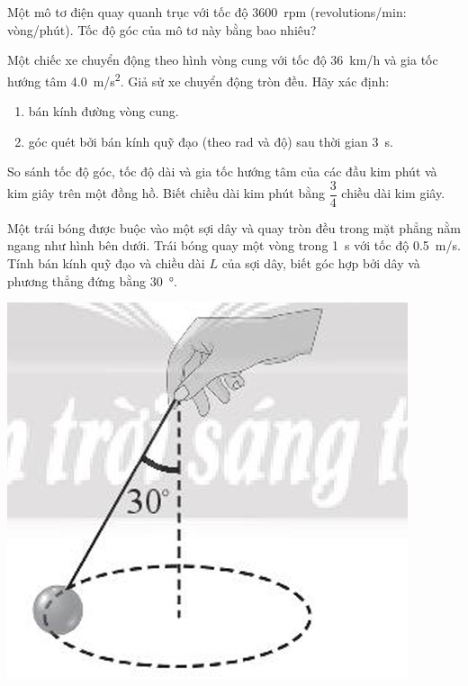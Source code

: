 \begin{ex}
	Một mô tơ điện quay quanh trục với tốc độ \SI{3600}{rpm} (revolutions/min: vòng/phút). Tốc độ góc của mô tơ này bằng bao nhiêu?
	\loigiai{
		
	}
\end{ex}
\begin{ex}
	Một chiếc xe chuyển động theo hình vòng cung với tốc độ \SI{36}{\kilo\meter/\hour} và gia tốc hướng tâm \SI{4.0}{\meter/\second^2}. Giả sử xe chuyển động tròn đều. Hãy xác định:
	\begin{enumerate}[label=\alph*)]
		\item bán kính đường vòng cung.
		\item góc quét bởi bán kính quỹ đạo (theo rad và độ) sau thời gian \SI{3}{\second}.
	\end{enumerate}
	\loigiai{
		
	}
\end{ex}
\begin{ex}
	So sánh tốc độ góc, tốc độ dài và gia tốc hướng tâm của các đầu kim phút và kim giây trên một đồng hồ. Biết chiều dài kim phút bằng $\dfrac{3}{4}$ chiều dài kim giây.
	\loigiai{
		
	}
\end{ex}
\begin{ex}
	Một trái bóng được buộc vào một sợi dây và quay tròn đều trong mặt phẳng nằm ngang như hình bên dưới. Trái bóng quay một vòng trong \SI{1}{\second} với tốc độ \SI{0.5}{\meter/\second}. Tính bán kính quỹ đạo và chiều dài $L$ của sợi dây, biết góc hợp bởi dây và phương thẳng đứng bằng \SI{30}{\degree}.
	\begin{center}
		\includegraphics[scale=0.4]{../figs/D10-CK2-003-2}
	\end{center}
	\loigiai{
		
	}
\end{ex}
